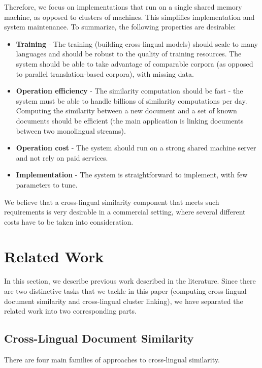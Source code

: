 \documentclass[twoside,11pt]{article}
\begin{document}
Therefore, we focus on implementations that run on a single shared memory machine, as opposed to clusters of machines. This simplifies implementation and system maintenance.
To summarize, the following properties are desirable:
\begin{itemize}
\item \textbf{Training} - The training (building cross-lingual models) should scale to many languages and should be robust to the quality of training resources. The system should be able to take advantage of comparable corpora (as opposed to parallel translation-based corpora), with missing data.
\item \textbf{Operation efficiency} - The similarity computation should be fast - the system must be able to handle billions of similarity computations per day. Computing the similarity between a new document and a set of known documents should be efficient (the main application is linking documents between two monolingual streams).
\item \textbf{Operation cost} - The system should run on a strong shared machine server and not rely on paid services.
\item \textbf{Implementation} - The system is straightforward to implement, with few parameters to tune.
\end{itemize}
We believe that a cross-lingual similarity component that meets such requirements is very desirable in a commercial setting, where several different costs have to be taken into consideration.

\section{Related Work}\label{sec:related}

In this section, we describe previous work described  in the literature. Since there are two distinctive tasks that we tackle in this paper (computing cross-lingual document similarity and cross-lingual cluster linking), we have separated the related work into two corresponding parts.

\subsection{Cross-Lingual Document Similarity}

There are four main families of approaches to cross-lingual similarity.
\end{document}
